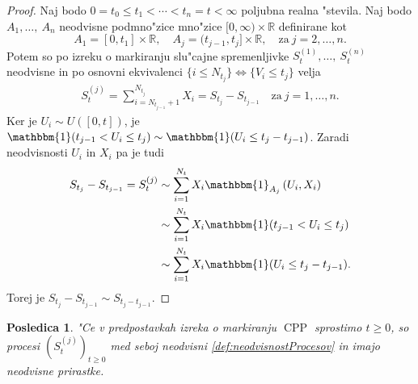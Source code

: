 \documentclass[12pt, a4paper, reqno]{amsart}
\theoremstyle{definition}
\theoremstyle{plain}
\newtheorem{posledica}[definicija]{Posledica}
\newcommand{\R}{\mathbb{R}}
\newcommand{\1}{\mathds{1}}
\DeclareMathOperator{\CPP}{CPP}
\newcommand*{\refPriloga}[1]{%
  \begingroup
    \hypersetup{
      linkcolor=red,
      linkbordercolor=red,
    }%
    \ref{#1}%
  \endgroup
}
\begin{document}
        \begin{proof}
            Naj bodo $0=t_0\leq t_1 < \cdots < t_n = t < \infty$
            poljubna realna "stevila. Naj bodo $A_1, \dots, \ A_n$ neodvisne podmno"zice
            mno"zice $[0, \infty) \times \R$ definirane kot
            \begin{equation*}
                A_1 = [0, t_1]\times \R, \quad A_j = (t_{j-1}, t_j]\times \R, \quad \text{za} \ j = 2, \dots, n.
            \end{equation*}
            Potem so po izreku o markiranju slu"cajne spremenljivke $S_{t}^{(1)}, \dots, \ S_{t}^{(n)}$ neodvisne in 
            po osnovni ekvivalenci $\{i\leq N_{t_j}\} \iff \{V_i \leq t_j\}$ velja 
            \begin{align*}
                S^{(j)}_{t} = 
                \sum_{i = N_{t_{j-1}}+ 1}^{N_{t_j}}X_i = S_{t_j} - S_{t_{j-1}} \quad \text{za} \ j = 1, \dots, n.
            \end{align*}
            Ker je $U_i \sim U([0, t])$, je $\mathbbm{1}({t_{j-1}} < U_i\leq t_j) \sim \mathbbm{1}(U_i \leq t_j - t_{j-1})$.
            Zaradi neodvisnosti $U_i$ in $X_i$ pa je tudi 
            \begin{align*}
                S_{t_j} - S_{t_{j-1}} = S_t^{(j)} &\sim \sum_{i=1}^{N_t}X_i\mathbbm{1}_{A_j}\left(U_i, X_i\right) \\
                &\sim \sum_{i=1}^{N_t}X_i\mathbbm{1}({t_{j-1}} < U_i\leq t_j) \\
                &\sim \sum_{i=1}^{N_t}X_i\mathbbm{1}(U_i \leq t_j - t_{j-1}).
            \end{align*}
            Torej je $S_{t_j} - S_{t_{j-1}} \sim S_{t_j - t_{j-1}}$.
        \end{proof}

        \begin{posledica}
            "Ce v predpostavkah izreka o markiranju $\CPP$ sprostimo $t\geq0$, so procesi $(S_t^{(j)})_{t\geq0}$ 
            med seboj neodvisni \refPriloga{def:neodvisnostProcesov} in imajo neodvisne prirastke. 
            \label{pos:neodvisnostCPPmedSabo}
        \end{posledica}
\end{document}
